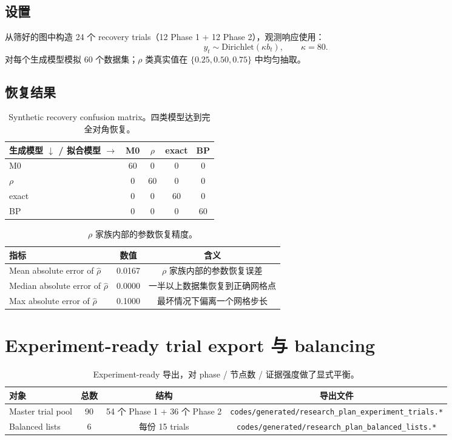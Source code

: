 \documentclass[11pt,a4paper]{ctexart}
\begin{document}
\subsection{设置}

从筛好的图中构造 24 个 recovery trials（12 Phase 1 + 12 Phase 2），观测响应使用：
\[
y_t \sim \mathrm{Dirichlet}(\kappa b_t),\qquad \kappa = 80.
\]
对每个生成模型模拟 60 个数据集；$\rho$ 类真实值在 $\{0.25,0.50,0.75\}$ 中均匀抽取。

\subsection{恢复结果}

\begin{table}[ht]
\centering\small
\begin{tabular}{lcccc}
\toprule
生成模型 $\downarrow$ / 拟合模型 $\rightarrow$ & M0 & $\rho$ & exact & BP \\
\midrule
M0    & 60 &  0 &  0 &  0 \\
$\rho$ &  0 & 60 &  0 &  0 \\
exact  &  0 &  0 & 60 &  0 \\
BP     &  0 &  0 &  0 & 60 \\
\bottomrule
\end{tabular}
\caption{Synthetic recovery confusion matrix。四类模型达到完全对角恢复。}
\end{table}

\begin{table}[ht]
\centering\small
\begin{tabular}{lcc}
\toprule
指标 & 数值 & 含义 \\
\midrule
Mean absolute error of $\hat\rho$ & 0.0167 & $\rho$ 家族内部的参数恢复误差 \\
Median absolute error of $\hat\rho$ & 0.0000 & 一半以上数据集恢复到正确网格点 \\
Max absolute error of $\hat\rho$ & 0.1000 & 最坏情况下偏离一个网格步长 \\
\bottomrule
\end{tabular}
\caption{$\rho$ 家族内部的参数恢复精度。}
\end{table}

\section{Experiment-ready trial export 与 balancing}

\begin{table}[ht]
\centering\small
\begin{tabular}{lccc}
\toprule
对象 & 总数 & 结构 & 导出文件 \\
\midrule
Master trial pool & 90 & 54 个 Phase 1 + 36 个 Phase 2 & \texttt{codes/generated/research\_plan\_experiment\_trials.*} \\
Balanced lists & 6 & 每份 15 trials & \texttt{codes/generated/research\_plan\_balanced\_lists.*} \\
\bottomrule
\end{tabular}
\caption{Experiment-ready 导出，对 phase / 节点数 / 证据强度做了显式平衡。}
\end{table}
\end{document}
